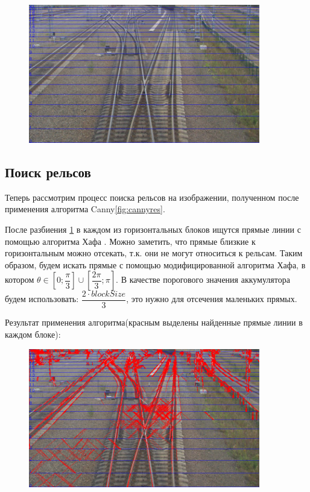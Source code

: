 \begin{figure}[!h]
	\centering
	\includegraphics[width=0.9\textwidth]{pictures/horizontal_blocks.png}
	\caption[Разбиение на горизонтальные блоки]{}
	\label{fig:horizontal_blocks}
\end{figure}

\subsection{Поиск рельсов}\label{rails_find}
Теперь рассмотрим процесс поиска рельсов на изображении, полученном после применения алгоритма Canny\ref{fig:cannyres}.

После разбиения \ref{fig:horizontal_blocks} в каждом из горизонтальных блоков ищутся прямые линии с помощью алгоритма Хафа \cite{b:hough_transform}. Можно заметить, что прямые близкие к горизонтальным можно отсекать, т.к. они не могут относиться к рельсам. Таким образом, будем искать прямые с помощью модифицированной алгоритма Хафа, в котором $\theta \in [0;\dfrac{\pi}{3}] \cup [\dfrac{2\pi}{3};\pi]$. В качестве порогового значения аккумулятора будем использовать: $\dfrac{2\cdot blockSize}{3}$, это нужно для отсечения маленьких прямых.

Результат применения алгоритма(красным выделены найденные прямые линии в каждом блоке):
\begin{figure}[!h]
	\centering
	\includegraphics[width=0.9\textwidth]{pictures/hough_lines_res}
	\caption[Результат применения алгоритма]{}
	\label{fig:houghlinesres}
\end{figure}

